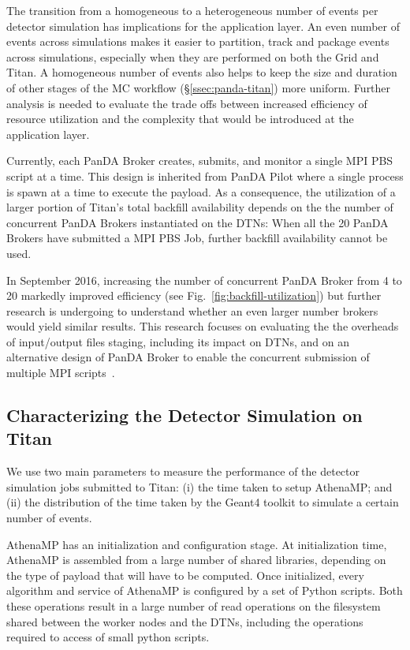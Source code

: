 The transition from a homogeneous to a heterogeneous number of events per
detector simulation has implications for the application layer. An even number
of events across simulations makes it easier to partition, track and package
events across simulations, especially when they are performed on both the Grid
and Titan. A homogeneous number of events also helps to keep the size and
duration of other stages of the MC workflow (\S\ref{ssec:panda-titan}) more
uniform. Further analysis is needed to evaluate the trade offs between increased
efficiency of resource utilization and the complexity that would be introduced
at the application layer.

Currently, each PanDA Broker creates, submits, and monitor a single MPI PBS
script at a time. This design is inherited from PanDA Pilot where a single
process is spawn at a time to execute the payload. As a consequence, the
utilization of a larger portion of Titan's total backfill availability depends
on the the number of concurrent PanDA Brokers instantiated on the DTNs: When all
the 20 PanDA Brokers have submitted a MPI PBS Job, further backfill availability
cannot be used.

In September 2016, increasing the number of concurrent PanDA Broker from 4 to 20
markedly improved efficiency (see Fig.~\ref{fig:backfill-utilization}) but
further research is undergoing to understand whether an even larger number
brokers would yield similar results. This research focuses on evaluating the the
overheads of input/output files staging, including its impact on DTNs, and on an
alternative design of PanDA Broker to enable the concurrent submission of
multiple MPI scripts~\cite{barreiro2016panda}.

\subsection{Characterizing the Detector Simulation on Titan}
\label{ssec:athenamp_titan}

We use two main parameters to measure the performance of the detector simulation
jobs submitted to Titan: (i) the time taken to setup AthenaMP; and (ii) the
distribution of the time taken by the Geant4 toolkit to simulate a certain
number of events.

AthenaMP has an initialization and configuration stage. At initialization time,
AthenaMP is assembled from a large number of shared libraries, depending on the
type of payload that will have to be computed. Once initialized, every algorithm
and service of AthenaMP is configured by a set of Python scripts. Both these
operations result in a large number of read operations on the filesystem shared
between the worker nodes and the DTNs, including the operations required to
access of small python scripts.

